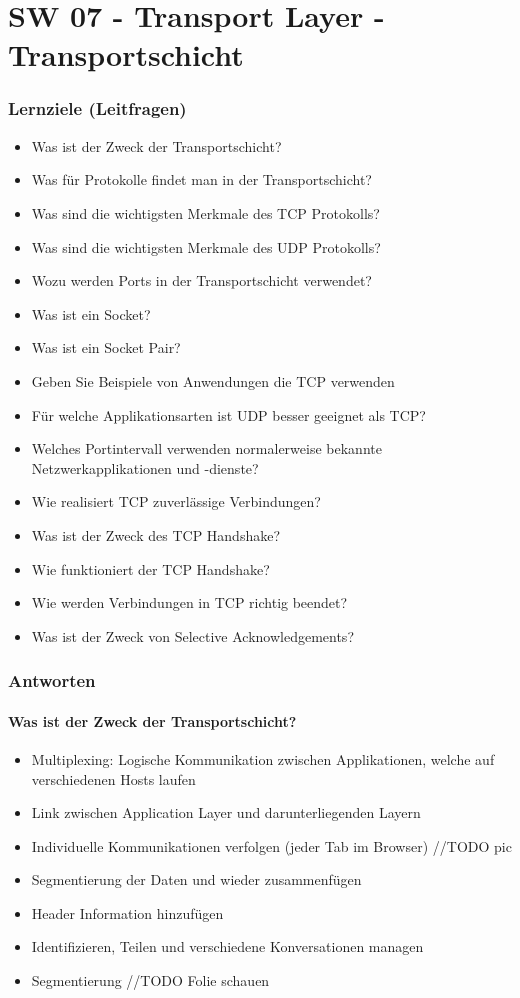 \part{SW 07 - Transport Layer - Transportschicht}
\section{Lernziele (Leitfragen)}
\begin{itemize}
    \item Was ist der Zweck der Transportschicht?
    \item Was für Protokolle findet man in der Transportschicht?
    \item Was sind die wichtigsten Merkmale des TCP Protokolls?
    \item Was sind die wichtigsten Merkmale des UDP Protokolls?
    \item Wozu werden Ports in der Transportschicht verwendet?
    \item Was ist ein Socket?
    \item Was ist ein \flqq{}Socket Pair\frqq?
    \item Geben Sie Beispiele von Anwendungen die TCP verwenden
    \item Für welche Applikationsarten ist UDP besser geeignet als TCP?
    \item Welches Portintervall verwenden normalerweise bekannte Netzwerkapplikationen und -dienste?
    \item Wie realisiert TCP zuverlässige Verbindungen?
    \item Was ist der Zweck des TCP Handshake?
    \item Wie funktioniert der TCP Handshake?
    \item Wie werden Verbindungen in TCP richtig beendet?
    \item Was ist der Zweck von \flqq{}Selective Acknowledgements\frqq?
\end{itemize}

\section{Antworten}
\subsection*{Was ist der Zweck der Transportschicht?}
\begin{itemize}
    \item Multiplexing: Logische Kommunikation zwischen Applikationen, welche auf verschiedenen Hosts laufen
    \item Link zwischen Application Layer und darunterliegenden Layern
    \item Individuelle Kommunikationen verfolgen (jeder Tab im Browser) //TODO pic
    \item Segmentierung der Daten und wieder zusammenfügen
    \item Header Information hinzufügen
    \item Identifizieren, Teilen und verschiedene Konversationen managen
    \item Segmentierung //TODO Folie schauen
\end{itemize}
